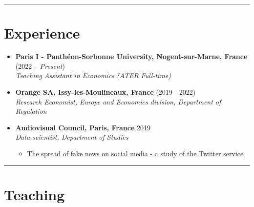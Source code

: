 \documentclass[
]{article}
\providecommand{\tightlist}{%
  \setlength{\itemsep}{0pt}\setlength{\parskip}{0pt}}
\begin{document}
\begin{center}\rule{0.5\linewidth}{0.5pt}\end{center}

\section{Experience}\label{experience}

\begin{itemize}
\item
  \textbf{Paris I - Panthéon-Sorbonne University, Nogent-sur-Marne,
  France} (2022 -- \emph{Present})\\
  \emph{Teaching Assistant in Economics (ATER Full-time)}
\item
  \textbf{Orange SA, Issy-les-Moulineaux, France} (2019 - 2022)\\
  \emph{Research Economist, Europe and Economics division, Department of
  Regulation}
\item
  \textbf{Audiovisual Council, Paris, France} 2019\\
  \emph{Data scientist, Department of Studies}

  \begin{itemize}
  \tightlist
  \item
    \href{https://www.csa.fr/Informer/Collections-du-CSA/Focus-Toutes-les-etudes-et-les-comptes-rendus-synthetiques-proposant-un-zoom-sur-un-sujet-d-actualite/La-propagation-des-fausses-informations-sur-les-reseaux-sociaux-etude-de-la-plateforme-Twitter}{The
    spread of fake news on social media - a study of the Twitter
    service}
  \end{itemize}
\end{itemize}

\begin{center}\rule{0.5\linewidth}{0.5pt}\end{center}

\section{Teaching}\label{teaching}
\end{document}
